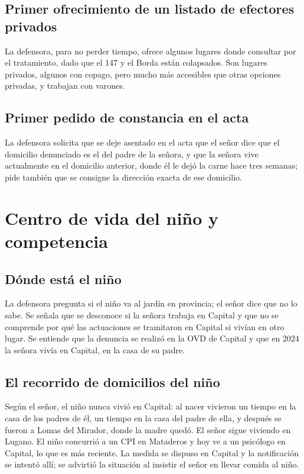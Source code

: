 \documentclass[12pt,oneside]{book}
\begin{document}
\subsection{Primer ofrecimiento de un listado de efectores privados}

La defensora, para no perder tiempo, ofrece algunos lugares donde consultar por el tratamiento, dado que el 147 y el Borda est\'an colapsados. Son lugares privados, algunos con copago, pero mucho m\'as accesibles que otras opciones privadas, y trabajan con varones.

\subsection{Primer pedido de constancia en el acta}

La defensora solicita que se deje asentado en el acta que el se\~nor dice que el domicilio denunciado es el del padre de la se\~nora, y que la se\~nora vive actualmente en el domicilio anterior, donde \'el le dej\'o la carne hace tres semanas; pide tambi\'en que se consigne la direcci\'on exacta de ese domicilio.

\section{Centro de vida del ni\~no y competencia}

\subsection{D\'onde est\'a el ni\~no}

La defensora pregunta si el ni\~no va al jard\'in en provincia; el se\~nor dice que no lo sabe. Se se\~nala que se desconoce si la se\~nora trabaja en Capital y que no se comprende por qu\'e las actuaciones se tramitaron en Capital si viv\'ian en otro lugar. Se entiende que la denuncia se realiz\'o en la OVD de Capital y que en 2024 la se\~nora viv\'ia en Capital, en la casa de su padre.

\subsection{El recorrido de domicilios del ni\~no}

Seg\'un el se\~nor, el ni\~no nunca vivi\'o en Capital: al nacer vivieron un tiempo en la casa de los padres de \'el, un tiempo en la casa del padre de ella, y despu\'es se fueron a Lomas del Mirador, donde la madre qued\'o. El se\~nor sigue viviendo en Lugano. El ni\~no concurri\'o a un CPI en Mataderos y hoy ve a un psic\'ologo en Capital, lo que es m\'as reciente. La medida se dispuso en Capital y la notificaci\'on se intent\'o all\'i; se advirti\'o la situaci\'on al insistir el se\~nor en llevar comida al ni\~no.
\end{document}
